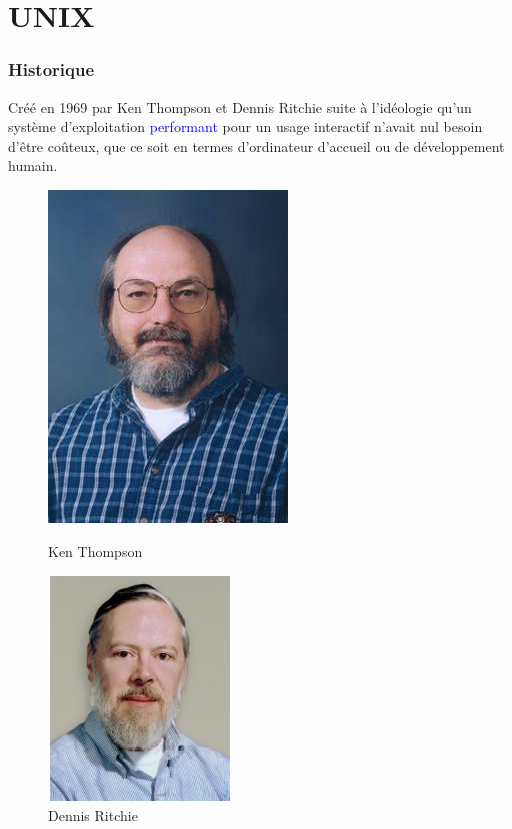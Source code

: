 \documentclass[aspectratio=169]{beamer}
\begin{document}
\section{UNIX}
\begin{frame}
  \frametitle{Historique}
  Créé en 1969 par Ken Thompson et Dennis Ritchie suite à l'idéologie qu'un
système d'exploitation \textcolor{blue}{performant} pour un usage interactif
n'avait nul besoin d'être coûteux, que ce soit en termes d'ordinateur d'accueil
ou de développement humain.

\begin{figure}
\centering
\begin{minipage}{.4\textwidth}
  \centering
  \includegraphics[width=.45\linewidth]{textures/images/unix/thompson.jpeg}
  \caption{Ken Thompson}
\end{minipage}
\begin{minipage}{.45\textwidth}
  \centering
  \includegraphics[width=.45\linewidth]{textures/images/unix/ritchie.jpg}
  \caption{Dennis Ritchie}
\end{minipage}
\end{figure}
\end{frame}
\end{document}
